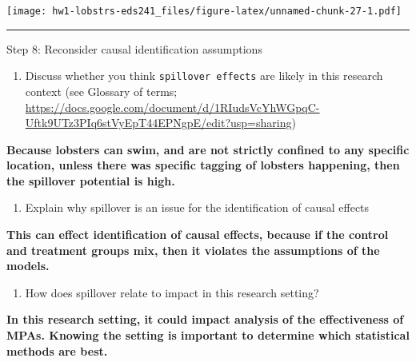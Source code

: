 \documentclass[
]{article}
\providecommand{\tightlist}{%
  \setlength{\itemsep}{0pt}\setlength{\parskip}{0pt}}
\begin{document}
\texttt{[image: hw1-lobstrs-eds241\_files/figure-latex/unnamed-chunk-27-1.pdf]}

\begin{center}\rule{0.5\linewidth}{0.5pt}\end{center}

Step 8: Reconsider causal identification assumptions

\begin{enumerate}
\def\labelenumi{\alph{enumi}.}
\tightlist
\item
  Discuss whether you think \texttt{spillover\ effects} are likely in
  this research context (see Glossary of terms;
  \url{https://docs.google.com/document/d/1RIudsVcYhWGpqC-Uftk9UTz3PIq6stVyEpT44EPNgpE/edit?usp=sharing})
\end{enumerate}

\textbf{Because lobsters can swim, and are not strictly confined to any
specific location, unless there was specific tagging of lobsters
happening, then the spillover potential is high.}

\begin{enumerate}
\def\labelenumi{\alph{enumi}.}
\setcounter{enumi}{1}
\tightlist
\item
  Explain why spillover is an issue for the identification of causal
  effects
\end{enumerate}

\textbf{This can effect identification of causal effects, because if the
control and treatment groups mix, then it violates the assumptions of
the models.}

\begin{enumerate}
\def\labelenumi{\alph{enumi}.}
\setcounter{enumi}{2}
\tightlist
\item
  How does spillover relate to impact in this research setting?
\end{enumerate}

\textbf{In this research setting, it could impact analysis of the
effectiveness of MPAs. Knowing the setting is important to determine
which statistical methods are best.}
\end{document}
